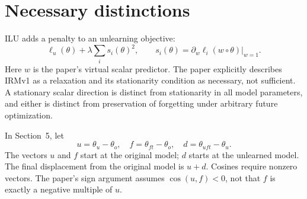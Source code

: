 \documentclass[10pt]{article}
\begin{document}
\section*{Necessary distinctions}
ILU adds a penalty to an unlearning objective: \[\ell_u(\theta)+\lambda\sum_i s_i(\theta)^2,\qquad
 s_i(\theta)=\left.\partial_w\ell_i(w\circ\theta)\right|_{w=1}.\] Here \(w\) is the paper’s virtual scalar predictor. The paper explicitly describes IRMv1 as a relaxation and its stationarity condition as necessary, not sufficient. A stationary scalar direction is distinct from stationarity in all model parameters, and either is distinct from preservation of forgetting under arbitrary future optimization.\par
In Section 5, let \[u=\theta_u-\theta_o,\quad f=\theta_{ft}-\theta_o,\quad
 d=\theta_{uft}-\theta_u.\] The vectors \(u\) and \(f\) start at the original model; \(d\) starts at the unlearned model. The final displacement from the original model is \(u+d\). Cosines require nonzero vectors. The paper’s sign argument assumes \(\cos(u,f)<0\), not that \(f\) is exactly a negative multiple of \(u\).\par
\end{document}

